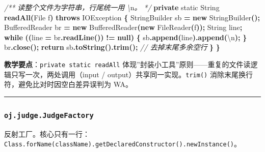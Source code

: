 \documentclass[
  11pt,
]{ctexart}
\newenvironment{Shaded}{\begin{snugshade}}{\end{snugshade}}
\newcommand{\BuiltInTok}[1]{#1}
\newcommand{\CharTok}[1]{\textcolor[rgb]{0.31,0.60,0.02}{#1}}
\newcommand{\CommentTok}[1]{\textcolor[rgb]{0.56,0.35,0.01}{\textit{#1}}}
\newcommand{\ControlFlowTok}[1]{\textcolor[rgb]{0.13,0.29,0.53}{\textbf{#1}}}
\newcommand{\DataTypeTok}[1]{\textcolor[rgb]{0.13,0.29,0.53}{#1}}
\newcommand{\FunctionTok}[1]{\textcolor[rgb]{0.13,0.29,0.53}{\textbf{#1}}}
\newcommand{\KeywordTok}[1]{\textcolor[rgb]{0.13,0.29,0.53}{\textbf{#1}}}
\newcommand{\NormalTok}[1]{#1}
\newcommand{\OperatorTok}[1]{\textcolor[rgb]{0.81,0.36,0.00}{\textbf{#1}}}
\begin{document}
\begin{Shaded}
\begin{Highlighting}[]
    \CommentTok{/**} \CommentTok{读整个文件为字符串，行尾统一用} \CommentTok{\textbackslash{}}\NormalTok{n}\CommentTok{。} \CommentTok{*/}
    \KeywordTok{private} \DataTypeTok{static} \BuiltInTok{String} \FunctionTok{readAll}\OperatorTok{(}\BuiltInTok{File}\NormalTok{ f}\OperatorTok{)} \KeywordTok{throws} \BuiltInTok{IOException} \OperatorTok{\{}
        \BuiltInTok{StringBuilder}\NormalTok{ sb }\OperatorTok{=} \KeywordTok{new} \BuiltInTok{StringBuilder}\OperatorTok{();}
        \BuiltInTok{BufferedReader}\NormalTok{ br }\OperatorTok{=} \KeywordTok{new} \BuiltInTok{BufferedReader}\OperatorTok{(}\KeywordTok{new} \BuiltInTok{FileReader}\OperatorTok{(}\NormalTok{f}\OperatorTok{));}
        \BuiltInTok{String}\NormalTok{ line}\OperatorTok{;}
        \ControlFlowTok{while} \OperatorTok{((}\NormalTok{line }\OperatorTok{=}\NormalTok{ br}\OperatorTok{.}\FunctionTok{readLine}\OperatorTok{())} \OperatorTok{!=} \KeywordTok{null}\OperatorTok{)} \OperatorTok{\{}
\NormalTok{            sb}\OperatorTok{.}\FunctionTok{append}\OperatorTok{(}\NormalTok{line}\OperatorTok{).}\FunctionTok{append}\OperatorTok{(}\CharTok{\textquotesingle{}\textbackslash{}n\textquotesingle{}}\OperatorTok{);}
        \OperatorTok{\}}
\NormalTok{        br}\OperatorTok{.}\FunctionTok{close}\OperatorTok{();}
        \ControlFlowTok{return}\NormalTok{ sb}\OperatorTok{.}\FunctionTok{toString}\OperatorTok{().}\FunctionTok{trim}\OperatorTok{();}   \CommentTok{// 去掉末尾多余空行}
    \OperatorTok{\}}
\OperatorTok{\}}
\end{Highlighting}
\end{Shaded}

\textbf{教学要点}：\texttt{private\ static\ readAll}
体现''封装小工具''原则------重复的文件读逻辑只写一次，两处调用（input /
output）共享同一实现。\texttt{trim()}
消除末尾换行符，避免比对时因空白差异误判为 WA。

\begin{center}\rule{0.5\linewidth}{0.5pt}\end{center}

\hypertarget{oj.judge.judgefactory}{%
\subsubsection{\texorpdfstring{\texttt{oj.judge.JudgeFactory}}{oj.judge.JudgeFactory}}\label{oj.judge.judgefactory}}

反射工厂。核心只有一行：\texttt{Class.forName(className).getDeclaredConstructor().newInstance()}。
\end{document}
